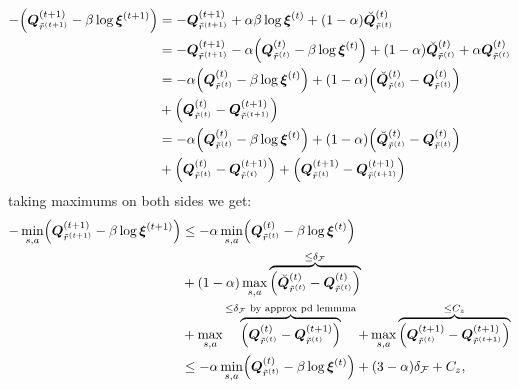 \begin{align*}
    - \Bigl( \bm{Q}_{\tilde{r}^{(t+1)}}^{(t+1)}  - \beta \log \bm{\xi}^{(t+1)} \Bigr) 
    &= 
    - \bm{Q}_{\tilde{r}^{(t+1)}}^{(t+1)}  
    + \alpha \beta \log \bm{\xi}^{(t)} + (1-\alpha) \breve{\bm{Q}}_{\tilde{r}^{(t)}}^{(t)}
    \\
    &= 
    - \bm{Q}_{\tilde{r}^{(t+1)}}^{(t+1)}  
    - \alpha \Bigl(\bm{Q}^{(t)}_{\tilde{r}^{(t)}} - \beta \log \bm{\xi}^{(t)}  \Bigr)
    + (1-\alpha) \breve{\bm{Q}}_{\tilde{r}^{(t)}}^{(t)}
    + \alpha \bm{Q}^{(t)}_{\tilde{r}^{(t)}}
    \\ 
    &= 
    - \alpha \Bigl(\bm{Q}^{(t)}_{\tilde{r}^{(t)}} - \beta \log \bm{\xi}^{(t)}  \Bigr)
    + (1-\alpha) \Bigl( 
        \breve{\bm{Q}}_{\tilde{r}^{(t)}}^{(t)} 
        - \bm{Q}^{(t)}_{\tilde{r}^{(t)}} 
    \Bigr) \\ & 
    + \Bigl(
        \bm{Q}^{(t)}_{\tilde{r}^{(t)}}   
        - \bm{Q}_{\tilde{r}^{(t+1)}}^{(t+1)}
    \Bigr)
    \\ 
    &= 
    - \alpha \Bigl(\bm{Q}^{(t)}_{\tilde{r}^{(t)}} - \beta \log \bm{\xi}^{(t)}  \Bigr)
    + (1-\alpha) \Bigl( 
        \breve{\bm{Q}}_{\tilde{r}^{(t)}}^{(t)} 
        - \bm{Q}^{(t)}_{\tilde{r}^{(t)}} 
    \Bigr) \\ & 
    + \Bigl(
        \bm{Q}^{(t)}_{\tilde{r}^{(t)}}   
        - \bm{Q}_{\tilde{r}^{(t)}}^{(t+1)}
        \Bigr)
    + \Bigl(
        \bm{Q}_{\tilde{r}^{(t)}}^{(t+1)}
        - \bm{Q}_{\tilde{r}^{(t+1)}}^{(t+1)}
    \Bigr)
    \\ 
\end{align*}
taking maximums on both sides we get:
\begin{align*}
    - \min_{s,a} \Bigl( \bm{Q}_{\tilde{r}^{(t+1)}}^{(t+1)}  - \beta \log \bm{\xi}^{(t+1)} \Bigr) 
    &\leq 
    - \alpha \min_{s,a} \Bigl(\bm{Q}^{(t)}_{\tilde{r}^{(t)}} - \beta \log \bm{\xi}^{(t)}  \Bigr) \\ &
    +(1-\alpha) \max_{s,a} \overbrace{\Bigl( 
        \breve{\bm{Q}}_{\tilde{r}^{(t)}}^{(t)}- 
        \bm{Q}^{(t)}_{\tilde{r}^{(t)}}  \Bigr)}^{\leq \delta_\mathcal{F}} \\ & 
    + \max_{s,a} \overbrace{\Bigl( 
        \bm{Q}^{(t)}_{\tilde{r}^{(t)}}   
        -\bm{Q}_{\tilde{r}^{(t)}}^{(t+1)}
        \Bigr)}^{\leq \delta_\mathcal{F}\text{ by approx pd lemmma}}
    + \max_{s,a} \overbrace{\Bigl(
        \bm{Q}_{\tilde{r}^{(t)}}^{(t+1)}
        - \bm{Q}_{\tilde{r}^{(t+1)}}^{(t+1)}
    \Bigr)}^{\leq C_z}
    \\ 
    &\leq
    - \alpha \min_{s,a} \Bigl(\bm{Q}^{(t)}_{\tilde{r}^{(t)}} - \beta \log \bm{\xi}^{(t)}  \Bigr)
    + (3-\alpha) \delta_\mathcal{F} + C_z, \\
\end{align*}
